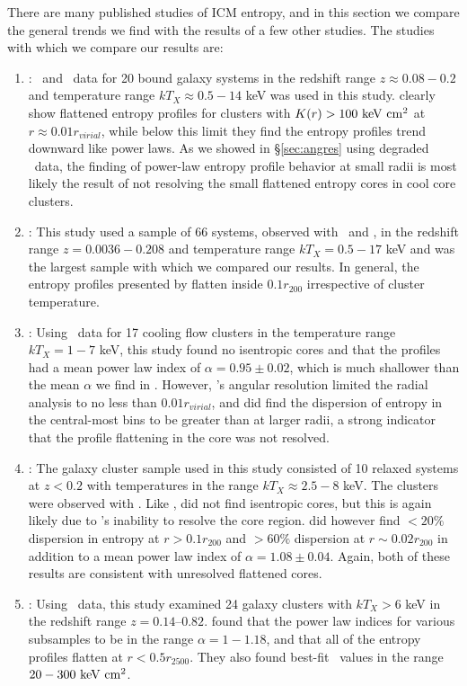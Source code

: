 \documentclass[12pt,preprint]{aastex}
\begin{document}
There are many published studies of ICM entropy, and in this section
we compare the general trends we find with the results of a few other
studies. The studies with which we compare our results are:
\begin{enumerate}
\item \citet{davies00}: \rosat\ and \asca\ data for 20 bound galaxy
  systems in the redshift range $z \approx 0.08-0.2$ and temperature
  range $kT_X \approx 0.5-14$ keV was used in this
  study. \citet{davies00} clearly show flattened entropy profiles for
  clusters with $K(r) > 100 \mathrm{\mbox{\ensuremath{\mathrm{~keV}}} \mathrm{\mbox{\ensuremath{\mathrm{~cm}}}^2}}$ at $r \approx 0.01 r_{virial}$,
  while below this limit they find the entropy profiles trend downward
  like power laws. As we showed in \S\ref{sec:angres} using degraded
  \xmm\ data, the finding of power-law entropy profile behavior at
  small radii is most likely the result of not resolving the small
  flattened entropy cores in cool core clusters.
\item \citet{ponman03}: This study used a sample of 66 systems,
  observed with \rosat\ and \asca, in the redshift range $z=
  0.0036-0.208$ and temperature range $kT_X = 0.5-17$ keV and was the
  largest sample with which we compared our results. In general, the
  entropy profiles presented by \citet{ponman03} flatten inside $0.1
  r_{200}$ irrespective of cluster temperature.
\item \citet{piffaretti05}: Using \xmm\ data for 17 cooling flow
  clusters in the temperature range $kT_X = 1-7$ keV, this study found
  no isentropic cores and that the profiles had a mean power law index
  of $\alpha = 0.95 \pm 0.02$, which is much shallower than the mean
  $\alpha$ we find in \accept. However, \xmm's angular resolution
  limited the radial analysis to no less than $0.01 r_{virial}$, and
  \citet{piffaretti05} did find the dispersion of entropy in the
  central-most bins to be greater than at larger radii, a strong
  indicator that the profile flattening in the core was not resolved.
\item \citet{pratt06}: The galaxy cluster sample used in this study
  consisted of 10 relaxed systems at $z < 0.2$ with temperatures in
  the range $kT_X \approx 2.5-8$ keV. The clusters were observed with
  \xmm. Like \citet{piffaretti05}, \citet{pratt06} did not find
  isentropic cores, but this is again likely due to \xmm's inability
  to resolve the core region. \citet{pratt06} did however find $<
  20\%$ dispersion in entropy at $r > 0.1r_{200}$ and $> 60\%$
  dispersion at $r \sim 0.02r_{200}$ in addition to a mean power law
  index of $\alpha = 1.08 \pm 0.04$. Again, both of these results are
  consistent with unresolved flattened cores.
\item \citet{morandi07}: Using \chandra\ data, this study examined 24
  galaxy clusters with $kT_X > 6$ keV in the redshift range
  $z=0.14–0.82$. \citet{morandi07} found that the power law indices
  for various subsamples to be in the range $\alpha=1-1.18$, and that
  all of the entropy profiles flatten at $r < 0.5r_{2500}$. They also
  found best-fit \kna\ values in the range $20-300 \mathrm{\mbox{\ensuremath{\mathrm{~keV}}} \mathrm{\mbox{\ensuremath{\mathrm{~cm}}}^2}}$.
\end{enumerate}
\end{document}

